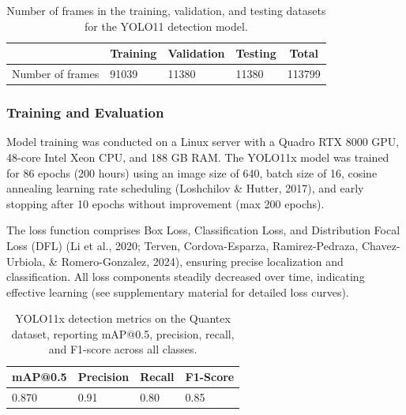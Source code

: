 \documentclass[
  man,floatsintext]{apa6}
\begin{document}
\begin{table}[tbp]

\begin{center}
\begin{threeparttable}

\caption{\label{tab:det-dataset-splits-short}Number of frames in the training, validation, and testing datasets for the YOLO11 detection model.}

\begin{tabular}{lllll}
\toprule
 & \multicolumn{1}{c}{Training} & \multicolumn{1}{c}{Validation} & \multicolumn{1}{c}{Testing} & \multicolumn{1}{c}{Total}\\
\midrule
Number of frames & 91039 & 11380 & 11380 & 113799\\
\bottomrule
\end{tabular}

\end{threeparttable}
\end{center}

\end{table}

\subsubsection{Training and Evaluation}\label{training-face}

Model training was conducted on a Linux server with a Quadro RTX 8000 GPU, 48-core Intel Xeon CPU, and 188 GB RAM. The YOLO11x model was trained for 86 epochs (200 hours) using an image size of 640, batch size of 16, cosine annealing learning rate scheduling (Loshchilov \& Hutter, 2017), and early stopping after 10 epochs without improvement (max 200 epochs).

The loss function comprises Box Loss, Classification Loss, and Distribution Focal Loss (DFL) (Li et al., 2020; Terven, Cordova-Esparza, Ramirez-Pedraza, Chavez-Urbiola, \& Romero-Gonzalez, 2024), ensuring precise localization and classification. All loss components steadily decreased over time, indicating effective learning (see supplementary material for detailed loss curves).

\begin{table}[tbp]

\begin{center}
\begin{threeparttable}

\caption{\label{tab:det-metrics-short}YOLO11x detection metrics on the Quantex dataset, reporting mAP@0.5, precision, recall, and F1-score across all classes.}

\begin{tabular}{llll}
\toprule
mAP@0.5 & \multicolumn{1}{c}{Precision} & \multicolumn{1}{c}{Recall} & \multicolumn{1}{c}{F1-Score}\\
\midrule
0.870 & 0.91 & 0.80 & 0.85\\
\bottomrule
\end{tabular}

\end{threeparttable}
\end{center}

\end{table}
\end{document}
